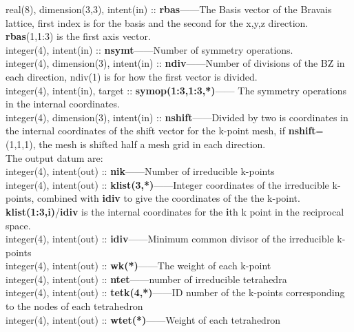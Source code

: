 \documentclass[10pt]{article}
\begin{document}
real(8), dimension(3,3), intent(in) :: \textbf{rbas}------The Basis vector of the Bravais lattice, first index is for the basis and the second for the x,y,z direction. \textbf{rbas}(1,1:3) is the first axis vector.\\

integer(4), intent(in) :: \textbf{nsymt}------Number of symmetry operations. \\

integer(4), dimension(3), intent(in) :: \textbf{ndiv}------Number of divisions of the BZ in each direction, ndiv(1) is for how the first vector is divided.  \\

integer(4), intent(in), target :: \textbf{symop(1:3,1:3,*)}------ The symmetry operations in the internal coordinates.\\

integer(4), dimension(3), intent(in) :: \textbf{nshift}------Divided by two is coordinates in the internal coordinates of the shift vector for the k-point mesh, if \textbf{nshift}=(1,1,1), the mesh is shifted half a mesh grid in each direction.  \\


The output datum are:\\

integer(4), intent(out) :: \textbf{nik}------Number of irreducible k-points\\

integer(4), intent(out) :: \textbf{klist(3,*)}------Integer coordinates of the irreducible k-points, combined with \textbf{idiv} to give the coordinates of the the k-point. \textbf{klist(1:3,i)}/\textbf{idiv} is the internal coordinates for the \textbf{i}th k point in the reciprocal space. \\

integer(4), intent(out) :: \textbf{idiv}------Minimum common divisor of the irreducible k-points\\

integer(4), intent(out) :: \textbf{wk(*)}------The weight of each k-point\\

integer(4), intent(out) :: \textbf{ntet}------number of irreducible tetrahedra\\

integer(4), intent(out) :: \textbf{tetk(4,*)}------ID number of the k-points corresponding to the nodes of each tetrahedron\\

integer(4), intent(out) :: \textbf{wtet(*)}------Weight of each tetrahedron\\
\end{document}
